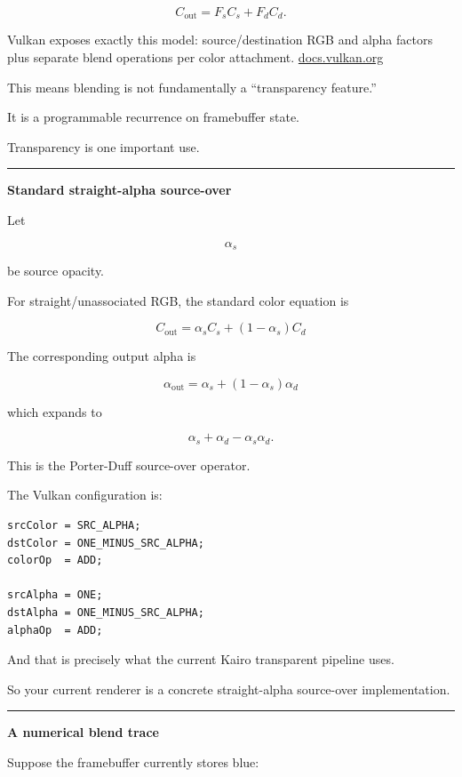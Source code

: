 \[
C_{\text{out}}
=
F_sC_s+F_dC_d.
\]

Vulkan exposes exactly this model: source/destination RGB and alpha factors plus separate blend operations per color attachment. \href{https://docs.vulkan.org/spec/latest/chapters/framebuffer.html?utm_source=chatgpt.com}{docs.vulkan.org}

This means blending is not fundamentally a ``transparency feature.''

It is a programmable recurrence on framebuffer state.

Transparency is one important use.

\begin{center}\rule{0.5\linewidth}{0.5pt}\end{center}

\textbf{Standard straight-alpha source-over}

Let

\[
\alpha_s
\]

be source opacity.

For straight/unassociated RGB, the standard color equation is

\[
\boxed{
C_{\text{out}}
=
\alpha_s C_s
+
(1-\alpha_s)C_d
}
\]

The corresponding output alpha is

\[
\boxed{
\alpha_{\text{out}}
=
\alpha_s+
(1-\alpha_s)\alpha_d
}
\]

which expands to

\[
\alpha_s+\alpha_d-\alpha_s\alpha_d.
\]

This is the Porter-Duff source-over operator.

The Vulkan configuration is:

\begin{verbatim}
srcColor = SRC_ALPHA;
dstColor = ONE_MINUS_SRC_ALPHA;
colorOp  = ADD;

srcAlpha = ONE;
dstAlpha = ONE_MINUS_SRC_ALPHA;
alphaOp  = ADD;
\end{verbatim}

And that is precisely what the current Kairo transparent pipeline uses.

So your current renderer is a concrete straight-alpha source-over implementation.

\begin{center}\rule{0.5\linewidth}{0.5pt}\end{center}

\textbf{A numerical blend trace}

Suppose the framebuffer currently stores blue:

